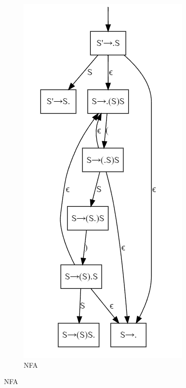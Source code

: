 \begin{figure}[H]
    \centering
    \begin{subfigure}{0.3\linewidth}
        \centering
        \includegraphics[height=2\linewidth]{pic/CP3/expnfa.png}
        \caption{NFA}

\end{subfigure}
\end{figure}
